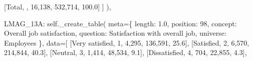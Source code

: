 \documentclass[
  11pt,
  a4paper,
]{article}
\newenvironment{Shaded}{\begin{snugshade}}{\end{snugshade}}
\newcommand{\NormalTok}[1]{\textcolor[rgb]{0.00,0.23,0.31}{#1}}
\newcommand{\OperatorTok}[1]{\textcolor[rgb]{0.37,0.37,0.37}{#1}}
\newcommand{\StringTok}[1]{\textcolor[rgb]{0.13,0.47,0.30}{#1}}
\newcommand{\VariableTok}[1]{\textcolor[rgb]{0.07,0.07,0.07}{#1}}
\begin{document}
\begin{Shaded}
\begin{Highlighting}[]
\NormalTok{            [}\StringTok{\textquotesingle{}Total\textquotesingle{}}\NormalTok{, }\StringTok{\textquotesingle{}\textquotesingle{}}\NormalTok{, }\StringTok{\textquotesingle{}16,138\textquotesingle{}}\NormalTok{, }\StringTok{\textquotesingle{}532,714\textquotesingle{}}\NormalTok{, }\StringTok{\textquotesingle{}100.0\textquotesingle{}}\NormalTok{]}
\NormalTok{        ]}
\NormalTok{    ),}

    \StringTok{\textquotesingle{}LMAG\_13A\textquotesingle{}}\NormalTok{: }\VariableTok{self}\NormalTok{.\_create\_table(}
\NormalTok{        meta}\OperatorTok{=}\NormalTok{\{}
            \StringTok{\textquotesingle{}length\textquotesingle{}}\NormalTok{: }\StringTok{\textquotesingle{}1.0\textquotesingle{}}\NormalTok{, }\StringTok{\textquotesingle{}position\textquotesingle{}}\NormalTok{: }\StringTok{\textquotesingle{}98\textquotesingle{}}\NormalTok{,}
            \StringTok{\textquotesingle{}concept\textquotesingle{}}\NormalTok{: }\StringTok{\textquotesingle{}Overall job satisfaction\textquotesingle{}}\NormalTok{,}
            \StringTok{\textquotesingle{}question\textquotesingle{}}\NormalTok{: }\StringTok{\textquotesingle{}Satisfaction with overall job\textquotesingle{}}\NormalTok{,}
            \StringTok{\textquotesingle{}universe\textquotesingle{}}\NormalTok{: }\StringTok{\textquotesingle{}Employees\textquotesingle{}}
\NormalTok{        \},}
\NormalTok{        data}\OperatorTok{=}\NormalTok{[}
\NormalTok{            [}\StringTok{\textquotesingle{}Very satisfied\textquotesingle{}}\NormalTok{, }\StringTok{\textquotesingle{}1\textquotesingle{}}\NormalTok{, }\StringTok{\textquotesingle{}4,295\textquotesingle{}}\NormalTok{, }\StringTok{\textquotesingle{}136,591\textquotesingle{}}\NormalTok{, }\StringTok{\textquotesingle{}25.6\textquotesingle{}}\NormalTok{],}
\NormalTok{            [}\StringTok{\textquotesingle{}Satisfied\textquotesingle{}}\NormalTok{, }\StringTok{\textquotesingle{}2\textquotesingle{}}\NormalTok{, }\StringTok{\textquotesingle{}6,570\textquotesingle{}}\NormalTok{, }\StringTok{\textquotesingle{}214,844\textquotesingle{}}\NormalTok{, }\StringTok{\textquotesingle{}40.3\textquotesingle{}}\NormalTok{],}
\NormalTok{            [}\StringTok{\textquotesingle{}Neutral\textquotesingle{}}\NormalTok{, }\StringTok{\textquotesingle{}3\textquotesingle{}}\NormalTok{, }\StringTok{\textquotesingle{}1,414\textquotesingle{}}\NormalTok{, }\StringTok{\textquotesingle{}48,534\textquotesingle{}}\NormalTok{, }\StringTok{\textquotesingle{}9.1\textquotesingle{}}\NormalTok{],}
\NormalTok{            [}\StringTok{\textquotesingle{}Dissatisfied\textquotesingle{}}\NormalTok{, }\StringTok{\textquotesingle{}4\textquotesingle{}}\NormalTok{, }\StringTok{\textquotesingle{}704\textquotesingle{}}\NormalTok{, }\StringTok{\textquotesingle{}22,855\textquotesingle{}}\NormalTok{, }\StringTok{\textquotesingle{}4.3\textquotesingle{}}\NormalTok{],}

\end{Highlighting}
\end{Shaded}
\end{document}
